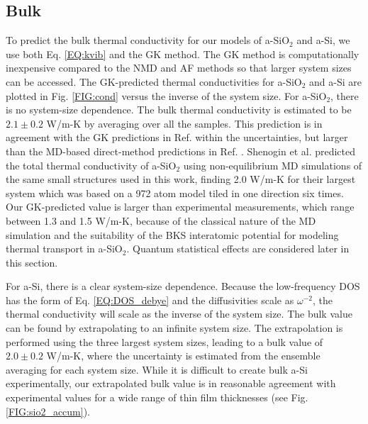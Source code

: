 \documentclass[aps,prb,onecolumn,preprint,superscriptaddress,footinbib,amsmath,amssymb,floatfix]{revtex4}
\begin{document}
\subsection{\label{S:Bulk}Bulk}

To predict the bulk thermal conductivity for our models of a-SiO$_2$ and 
a-Si, we use both Eq. \eqref{EQ:kvib} 
and the GK method. The GK method is computationally 
inexpensive compared to the NMD and AF methods so that 
larger system sizes can be accessed.  
The GK-predicted thermal conductivities for a-SiO$_2$ and a-Si 
are plotted in Fig. \ref{FIG:cond} versus the inverse of the system 
size. For a-SiO$_2$, there is no system-size dependence.  
The bulk thermal conductivity is estimated to be 
$2.1 \pm 0.2$ W/m-K by averaging over all the samples. This prediction 
is in agreement with the GK predictions in Ref. 
 within the uncertainties, 
but larger than the MD-based direct-method predictions in Ref. 
. 
Shenogin et al. predicted the total thermal 
conductivity of a-SiO$_2$ using 
non-equilibrium MD simulations of the same small structures 
used in this work, finding 2.0 W/m-K for their 
largest system which was based on a 972 atom model 
tiled in one direction six times.\cite{shenogin_predicting_2009}
Our GK-predicted value is larger than experimental 
measurements, which range between 
1.3 and 1.5 W/m-K,
\cite{cahill_lattice_1988,lee_heat_1997,
yamane_measurement_2002,regner_broadband_2013} 
because of the classical nature of the MD simulation 
and the suitability of the BKS interatomic potential 
for modeling thermal transport in a-SiO$_2$.
\cite{jund_molecular-dynamics_1999,mcgaughey_thermal_2004}
Quantum statistical effects are considered later in this section. 

For a-Si, there is a clear system-size dependence. 
Because the low-frequency DOS has the form of Eq. \eqref{EQ:DOS_debye} 
and the diffusivities scale as $\omega^{-2}$,  
the thermal conductivity will scale as the inverse of the system size. 
The bulk value can be found by extrapolating to an infinite system size.
\cite{shiomi_thermal_2011,esfarjani_heat_2011,larkin_comparison_2012} 
The extrapolation is performed using the three largest 
system sizes,\cite{mfp_fn2} leading to a bulk value 
of $2.0 \pm 0.2$ W/m-K, where the uncertainty is 
estimated from the ensemble averaging for each system size. 
While it is difficult to create 
bulk a-Si experimentally,\cite{vacher_attenuation_1980} 
our extrapolated bulk value 
is in reasonable agreement with experimental values for a wide 
range of thin film thicknesses (see Fig. \ref{FIG:sio2_accum}). 
\end{document}
